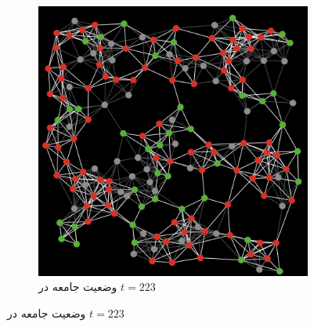 \begin{persian}
\begin{figure}[h]
\begin{subfigure}[b]{0.32\textwidth}
 \end{subfigure}%
 ~ %
 \begin{subfigure}[b]{0.32\textwidth}
 \includegraphics[width=\textwidth]{figures/SIRS/t223}
 \caption{وضعیت جامعه در $t=223$}
 

\end{subfigure}
\end{figure}
\end{persian}
